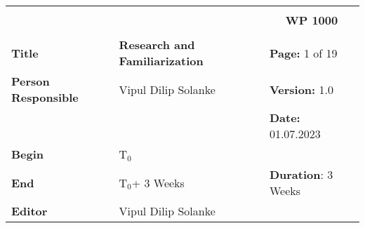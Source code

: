 \begin{table}[!h]
  \begin{center}
    \begin{tabular}{|p{35mm}||p{55mm}|p{50mm}||p{40mm}|}
      \hline
      \multicolumn{3}{|l||}{\textbf{}} & \multicolumn{1}{c|}{}                                                                                                                                                \\
      \multicolumn{3}{|l||}{\textbf{}} & \multicolumn{1}{c|}{\textbf{WP 1000}}                                                                                                                                \\
      \multicolumn{3}{|l||}{\textbf{}} & \multicolumn{1}{c|}{}                                                                                                                                                \\
      \hline\hline
      \textbf{Title}                   & \multicolumn{2}{p{7cm}||}{\textbf{Research and Familiarization}}
                                       & \textbf{Page:} 1 of 19                                                                                                                                              \\
      \hline
      \textbf{Person Responsible}        & \multicolumn{2}{l||}{Vipul Dilip Solanke}                                                                                                   & \textbf{Version:} 1.0   \\
      \hline
      \multicolumn{3}{|l||}{}          & \textbf{Date:} 01.07.2023                                                                                                                                          \\
      \hline\hline
      \textbf{Begin}                  & \multicolumn{2}{l||}{T$_0$}                                                                                                                &                         \\
      \hline
      \textbf{End}                    & \multicolumn{2}{l||}{T$_0$+ 3 Weeks}                                                                                                        & \textbf{Duration}: 3 Weeks \\
      \hline\hline
      \textbf{Editor}              & \multicolumn{3}{l|}{Vipul Dilip Solanke}                                                                                                                              \\

\end{tabular}
\end{center}
\end{table}
